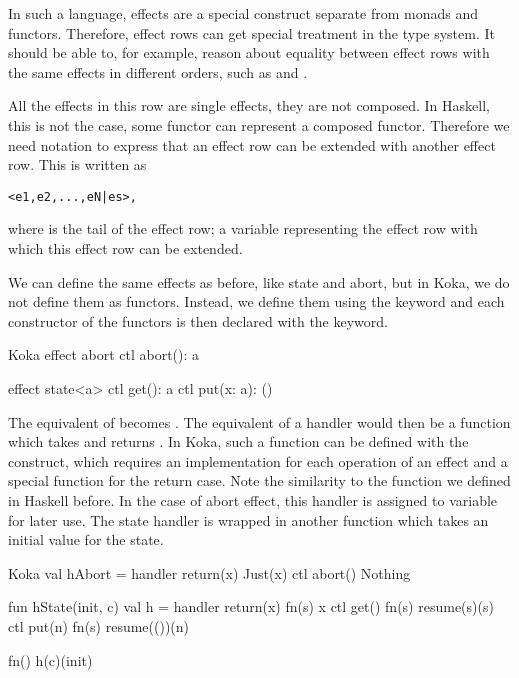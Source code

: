 In such a language, effects are a special construct separate from monads and functors. Therefore, effect rows can get special treatment in the type system. It should be able to, for example, reason about equality between effect rows with the same effects in different orders, such as  and .

All the effects in this row are single effects, they are not composed. In Haskell, this is not the case, some functor  can represent a composed functor. Therefore we need notation to express that an effect row can be extended with another effect row. This is written as
\begin{center}\texttt{<e1,e2,...,eN|es>,}\end{center}
where  is the tail of the effect row; a variable representing the effect row with which this effect row can be extended.

We can define the same effects as before, like state and abort, but in Koka, we do not define them as functors. Instead, we define them using the  keyword and each constructor of the functors is then declared with the  keyword.

\begin{lst}{Koka}
effect abort
  ctl abort(): a

effect state<a>
  ctl get(): a
  ctl put(x: a): ()
\end{lst}
\noindent The equivalent of  becomes . The equivalent of a handler would then be a function which takes  and returns . In Koka, such a function can be defined with the  construct, which requires an implementation for each operation of an effect and a special function for the return case. Note the similarity to the  function we defined in Haskell before. In the case of abort effect, this handler is assigned to variable for later use. The state handler is wrapped in another function which takes an initial value for the state.

\begin{lst}{Koka}
val hAbort = handler
  return(x)   Just(x)
  ctl abort() Nothing

fun hState(init, c)
  val h = handler
    return(x)  fn(s) x
    ctl get()  fn(s) resume(s)(s)
    ctl put(n) fn(s) resume(())(n)

  fn() h(c)(init)
\end{lst}

